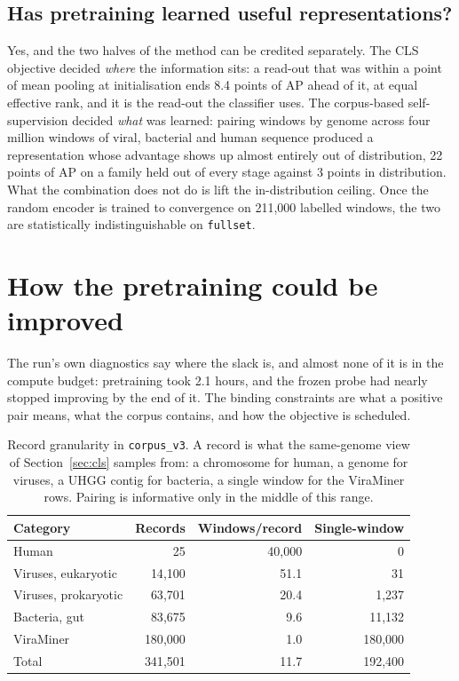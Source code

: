 \documentclass[10pt,twocolumn,a4paper]{article}
\begin{document}
\subsection{Has pretraining learned useful representations?}

Yes, and the two halves of the method can be credited separately. The CLS
objective decided \emph{where} the information sits: a read-out that was within a
point of mean pooling at initialisation ends 8.4 points of AP ahead of it, at
equal effective rank, and it is the read-out the classifier uses.
The corpus-based self-supervision decided \emph{what} was learned: pairing
windows by genome across four million windows of viral, bacterial and human
sequence produced a representation whose advantage shows up almost entirely out
of distribution, 22 points of AP on a family held out of every stage against 3
points in distribution. What the combination does not do is lift the
in-distribution ceiling. Once the random encoder is trained to convergence on
211{,}000 labelled windows, the two are statistically indistinguishable on
\texttt{fullset}.

\section{How the pretraining could be improved}\label{sec:improve}

The run's own diagnostics say where the slack is, and almost none of it is in the
compute budget: pretraining took 2.1 hours, and the frozen probe had nearly
stopped improving by the end of it. The binding constraints are what a positive
pair means, what the corpus contains, and how the objective is scheduled.

\begin{table}[t]
\centering
\caption{Record granularity in \texttt{corpus\_v3}. A record is what the
same-genome view of Section~\ref{sec:cls} samples from: a chromosome for human, a
genome for viruses, a UHGG contig for bacteria, a single window for the ViraMiner
rows. Pairing is informative only in the middle of this range.}
\label{tab:records}
\footnotesize
\setlength{\tabcolsep}{4pt}
\begin{tabular}{lrrr}
\toprule
Category & Records & Windows/record & Single-window \\
\midrule
Human                & 25      & 40{,}000 & 0 \\
Viruses, eukaryotic  & 14{,}100  & 51.1   & 31 \\
Viruses, prokaryotic & 63{,}701  & 20.4   & 1{,}237 \\
Bacteria, gut        & 83{,}675  & 9.6    & 11{,}132 \\
ViraMiner            & 180{,}000 & 1.0    & 180{,}000 \\
\midrule
Total                & 341{,}501 & 11.7   & 192{,}400 \\
\bottomrule
\end{tabular}
\end{table}
\end{document}
